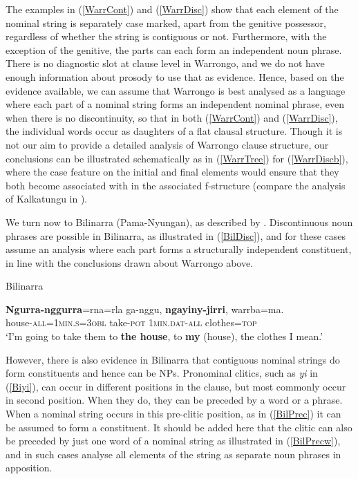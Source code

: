 \documentclass[output=paper,hidelinks]{langscibook}
\begin{document}
The examples in (\ref{WarrCont}) and (\ref{WarrDisc}) show that each element of the nominal string is separately case marked, apart from the genitive possessor, regardless of whether the string is contiguous or not. Furthermore, with the exception of the genitive, the parts can each form an independent noun phrase. There is no diagnostic slot at clause level in Warrongo, and we do not have enough information about prosody to use that as evidence. Hence, based on the evidence available, we can assume that Warrongo is best analysed as a language where each part of a nominal string forms an independent nominal phrase, even when there is no discontinuity, so that in both (\ref{WarrCont}) and (\ref{WarrDisc}), the individual words occur as daughters of a flat clausal structure. Though it is not our aim to provide a detailed analysis of Warrongo clause structure, our conclusions can be illustrated schematically as in (\ref{WarrTree}) for (\ref{WarrDiscb}), where the case feature on the initial and final elements would ensure that they both become associated with {\OBJ} in the associated f-structure (compare the analysis of Kalkatungu in \cite{Blake83}).




We turn now to Bilinarra (Pama-Nyungan), as described by \citet{MeakNord14}. Discontinuous noun phrases are possible in Bilinarra, as illustrated in (\ref{BilDisc}), and for these cases \citet[107--108]{MeakNord14} assume an analysis where each part forms a structurally independent constituent, in line with the conclusions drawn about Warrongo above.

\ea\label{BilDisc}Bilinarra  \citep[108]{MeakNord14}

\gll  \textbf{Ngurra-nggurra}=rna=rla ga-nggu, \textbf{ngayiny-jirri}, warrba=ma.\\
house-\textsc{all=1min.s=3obl} take-\textsc{pot} \textsc{1min.dat-all} clothes=\textsc{top}\\
\glt `I'm going to take them to \textbf{the house}, to \textbf{my} (house), the clothes I mean.'
\z

However, there is also evidence in Bilinarra that contiguous nominal strings do form constituents and hence can be NPs. Pronominal clitics, such as \emph{yi} in (\ref{Biyi}), can occur in different positions in the clause, but most commonly occur in second position. When they do, they can be preceded by a word or a phrase. When a nominal string occurs in this pre-clitic position, as in (\ref{BilPrec}) it can be assumed to form a constituent. It should be added here that the clitic can also be preceded by just one word of a nominal string as illustrated in (\ref{BilPrecw}), and in such cases \citeauthor{MeakNord14} analyse all elements of the string as separate noun phrases in apposition.
\end{document}
